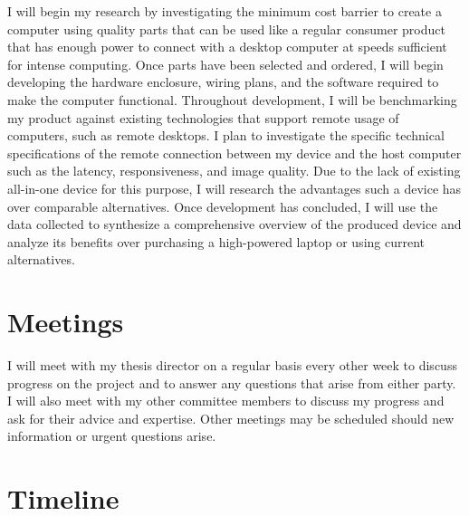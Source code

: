 \documentclass[11pt]{article}
\begin{document}
I will begin my research by investigating the minimum cost barrier to create a computer using quality parts that can be used like a regular consumer product that has enough power to connect with a desktop computer at speeds sufficient for intense computing.
Once parts have been selected and ordered, I will begin developing the hardware enclosure, wiring plans, and the software required to make the computer functional.
Throughout development, I will be benchmarking my product against existing technologies that support remote usage of computers, such as remote desktops.
I plan to investigate the specific technical specifications of the remote connection between my device and the host computer such as the latency, responsiveness, and image quality.
Due to the lack of existing all-in-one device for this purpose, I will research the advantages such a device has over comparable alternatives.
Once development has concluded, I will use the data collected to synthesize a comprehensive overview of the produced device and analyze its benefits over purchasing a high-powered laptop or using current alternatives.

\section*{Meetings}

I will meet with my thesis director on a regular basis every other week to discuss progress on the project and to answer any questions that arise from either party.
I will also meet with my other committee members to discuss my progress and ask for their advice and expertise.
Other meetings may be scheduled should new information or urgent questions arise.

\section*{Timeline}
\end{document}
